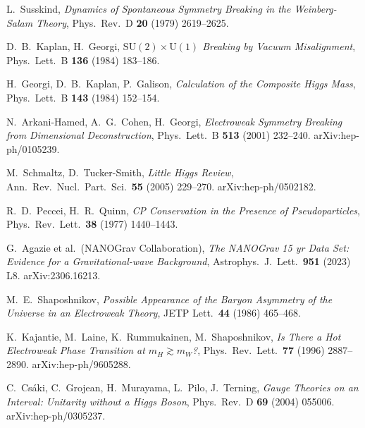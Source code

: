 \documentclass[11pt,a4paper]{article}
\newcommand{\SU}{\mathrm{SU}}
\newcommand{\UU}{\mathrm{U}}
\theoremstyle{definition}
\theoremstyle{plain}
\theoremstyle{remark}
\begin{document}
\begin{thebibliography}{99}
L.~Susskind, \emph{Dynamics of Spontaneous Symmetry Breaking in the Weinberg-Salam Theory}, Phys.\ Rev.\ D \textbf{20} (1979) 2619--2625.

D.~B.~Kaplan, H.~Georgi, \emph{$\SU(2) \times \UU(1)$ Breaking by Vacuum Misalignment}, Phys.\ Lett.\ B \textbf{136} (1984) 183--186.

H.~Georgi, D.~B.~Kaplan, P.~Galison, \emph{Calculation of the Composite Higgs Mass}, Phys.\ Lett.\ B \textbf{143} (1984) 152--154.

N.~Arkani-Hamed, A.~G.~Cohen, H.~Georgi, \emph{Electroweak Symmetry Breaking from Dimensional Deconstruction}, Phys.\ Lett.\ B \textbf{513} (2001) 232--240. arXiv:hep-ph/0105239.

M.~Schmaltz, D.~Tucker-Smith, \emph{Little Higgs Review}, Ann.\ Rev.\ Nucl.\ Part.\ Sci.\ \textbf{55} (2005) 229--270. arXiv:hep-ph/0502182.

R.~D.~Peccei, H.~R.~Quinn, \emph{CP Conservation in the Presence of Pseudoparticles}, Phys.\ Rev.\ Lett.\ \textbf{38} (1977) 1440--1443.

G.~Agazie et al.\ (NANOGrav Collaboration), \emph{The NANOGrav 15 yr Data Set: Evidence for a Gravitational-wave Background}, Astrophys.\ J.\ Lett.\ \textbf{951} (2023) L8. arXiv:2306.16213.

M.~E.~Shaposhnikov, \emph{Possible Appearance of the Baryon Asymmetry of the Universe in an Electroweak Theory}, JETP Lett.\ \textbf{44} (1986) 465--468.

K.~Kajantie, M.~Laine, K.~Rummukainen, M.~Shaposhnikov, \emph{Is There a Hot Electroweak Phase Transition at $m_H \gtrsim m_W$?}, Phys.\ Rev.\ Lett.\ \textbf{77} (1996) 2887--2890. arXiv:hep-ph/9605288.

C.~Cs\'aki, C.~Grojean, H.~Murayama, L.~Pilo, J.~Terning, \emph{Gauge Theories on an Interval: Unitarity without a Higgs Boson}, Phys.\ Rev.\ D \textbf{69} (2004) 055006. arXiv:hep-ph/0305237.

\end{thebibliography}

\end{document}
